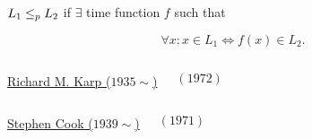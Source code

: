 \begin{frame}
  \begin{definition}
	\begin{center}
	  $L_1 \le_{p} L_2$ if $\exists$  time function $f$ such that
	\end{center}
	\[
	  \forall x: x \in L_1 \iff f(x) \in L_2.
	\]
  \end{definition}

  \pause
  \begin{center}
  \end{center}

  \pause
  \begin{columns}
	  \begin{center}
		\href{https://en.wikipedia.org/wiki/Richard\_M.\_Karp}{Richard M. Karp ($1935 \sim$)}
	  \end{center}
	  \begin{center}
		\href{https://people.eecs.berkeley.edu/~luca/cs172/karp.pdf}{$(1972)$}
	  \end{center}
  \end{columns}
\end{frame}

\begin{frame}
  \begin{center}
  \end{center}

  \begin{columns}
	  \begin{center}
		\href{https://en.wikipedia.org/wiki/Stephen\_Cook}{Stephen Cook ($1939 \sim$)}
	  \end{center}
	  \begin{center}
		\href{http://www.cs.toronto.edu/~sacook/homepage/1971.pdf}{$(1971)$}
	  \end{center}
  \end{columns}
\end{frame}

% 
